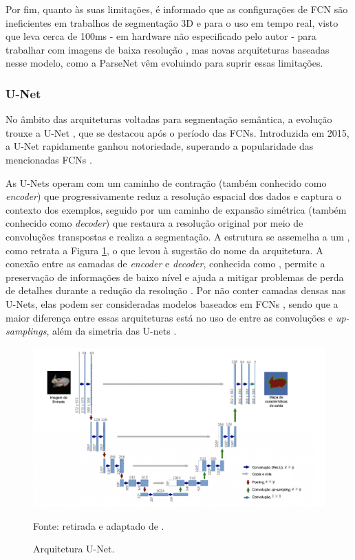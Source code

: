 Por fim, quanto às suas limitações, é informado que as configurações de FCN são ineficientes em trabalhos de segmentação 3D e para o uso em tempo real, visto que leva cerca de 100ms - em hardware não especificado pelo autor - para trabalhar com imagens de baixa resolução \citep{Minaee2021}, mas novas arquiteturas baseadas nesse modelo, como a ParseNet \citep{Liu2015} vêm evoluindo para suprir essas limitações.

\subsubsection{U-Net}
\label{semantic:unet}

No âmbito das arquiteturas voltadas para segmentação semântica, a evolução trouxe a U-Net \citep{Ronneberger2015U-net:Segmentation}, que se destacou após o período das FCNs. Introduzida em 2015, a U-Net rapidamente ganhou notoriedade, superando a popularidade das mencionadas FCNs \citep{Sultana2020EvolutionSurvey}.

As U-Nets operam com um caminho de contração (também conhecido como \textit{encoder}) que progressivamente reduz a resolução espacial dos dados e captura o contexto dos exemplos, seguido por um caminho de expansão simétrica (também conhecido como \textit{decoder}) que restaura a resolução original por meio de convoluções transpostas e realiza a segmentação. A estrutura se assemelha a um , como retrata a Figura \ref{semantic:fig:unet}, o que levou à sugestão do nome da arquitetura. A conexão entre as camadas de \textit{encoder} e \textit{decoder}, conhecida como , permite a preservação de informações de baixo nível e ajuda a mitigar problemas de perda de detalhes durante a redução da resolução \citep{Minaee2021, Minaee2021DeepClassification}. Por não conter camadas densas nas U-Nets, elas podem ser consideradas modelos baseados em FCNs \citep{Minaee2021}, sendo que a maior diferença entre essas arquiteturas está no uso de  entre as convoluções e \textit{up-samplings}, além da simetria das U-nets \citep{OZTURK2020ComparisonImageries}.

\begin{figure}[H]
    \centering
    \caption{Arquitetura U-Net.}
    \includegraphics[width=1\linewidth]{recursos/imagens/semantic/unet-arch.png}
    \label{semantic:fig:unet}

    Fonte: retirada e adaptado de \cite{Ronneberger2015U-net:Segmentation}.
\end{figure}

